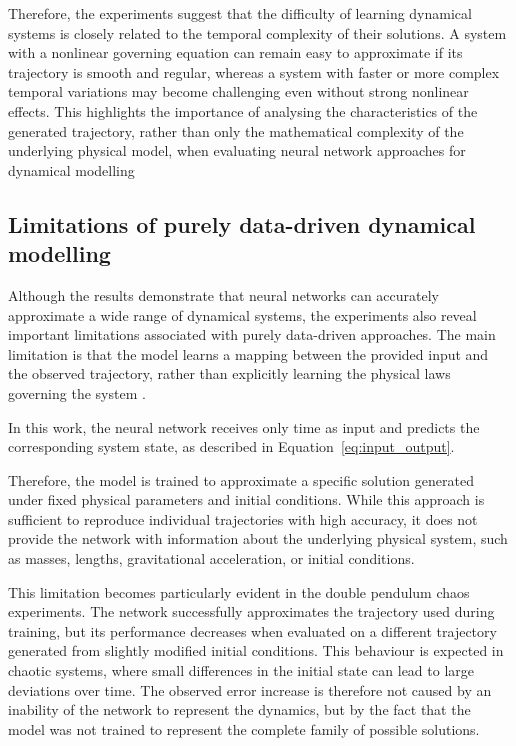 Therefore, the experiments suggest that the difficulty of learning dynamical systems is closely related to the temporal complexity of their solutions. A system with a nonlinear governing equation can remain easy to approximate if its trajectory is smooth and regular, whereas a system with faster or more complex temporal variations may become challenging even without strong nonlinear effects. This highlights the importance of analysing the characteristics of the generated trajectory, rather than only the mathematical complexity of the underlying physical model, when evaluating neural network approaches for dynamical modelling

\subsection{Limitations of purely data-driven dynamical modelling}
Although the results demonstrate that neural networks can accurately approximate a wide range of dynamical systems, the experiments also reveal important limitations associated with purely data-driven approaches. The main limitation is that the model learns a mapping between the provided input and the observed trajectory, rather than explicitly learning the physical laws governing the system \cite{raissi2019physics}.

In this work, the neural network receives only time as input and predicts the corresponding system state, as described in Equation~\ref{eq:input_output}.

Therefore, the model is trained to approximate a specific solution generated under fixed physical parameters and initial conditions. While this approach is sufficient to reproduce individual trajectories with high accuracy, it does not provide the network with information about the underlying physical system, such as masses, lengths, gravitational acceleration, or initial conditions.

This limitation becomes particularly evident in the double pendulum chaos experiments. The network successfully approximates the trajectory used during training, but its performance decreases when evaluated on a different trajectory generated from slightly modified initial conditions. This behaviour is expected in chaotic systems, where small differences in the initial state can lead to large deviations over time. The observed error increase is therefore not caused by an inability of the network to represent the dynamics, but by the fact that the model was not trained to represent the complete family of possible solutions.

